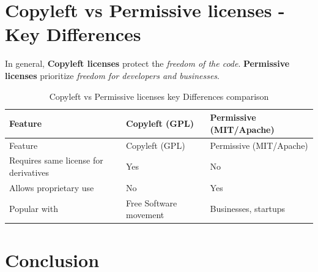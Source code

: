 \documentclass[
  11pt,
  letterpaper,
]{book}
\begin{document}
\section{Copyleft vs Permissive licenses - Key
Differences}\label{copyleft-vs-permissive-licenses---key-differences}

In general, \textbf{Copyleft licenses} protect the \emph{freedom of the
code}. \textbf{Permissive licenses} prioritize \emph{freedom for
developers and businesses}.

\begin{longtable}[]{@{}
  >{\raggedright\arraybackslash}p{}
  >{\raggedright\arraybackslash}p{}
  >{\raggedright\arraybackslash}p{}@{}}
\caption{Copyleft vs Permissive licenses key Differences
comparison}\label{tbl-liccomp}\tabularnewline
\toprule\noalign{}
\begin{minipage}[b]{\linewidth}\raggedright
Feature
\end{minipage} & \begin{minipage}[b]{\linewidth}\raggedright
Copyleft (GPL)
\end{minipage} & \begin{minipage}[b]{\linewidth}\raggedright
Permissive (MIT/Apache)
\end{minipage} \\
\midrule\noalign{}
\endfirsthead
\toprule\noalign{}
\begin{minipage}[b]{\linewidth}\raggedright
Feature
\end{minipage} & \begin{minipage}[b]{\linewidth}\raggedright
Copyleft (GPL)
\end{minipage} & \begin{minipage}[b]{\linewidth}\raggedright
Permissive (MIT/Apache)
\end{minipage} \\
\midrule\noalign{}
\endhead
\bottomrule\noalign{}
\endlastfoot
Requires same license for derivatives & Yes & No \\
Allows proprietary use & No & Yes \\
Popular with & Free Software movement & Businesses, startups \\
\end{longtable}

\section{Conclusion}\label{conclusion-2}
\end{document}
